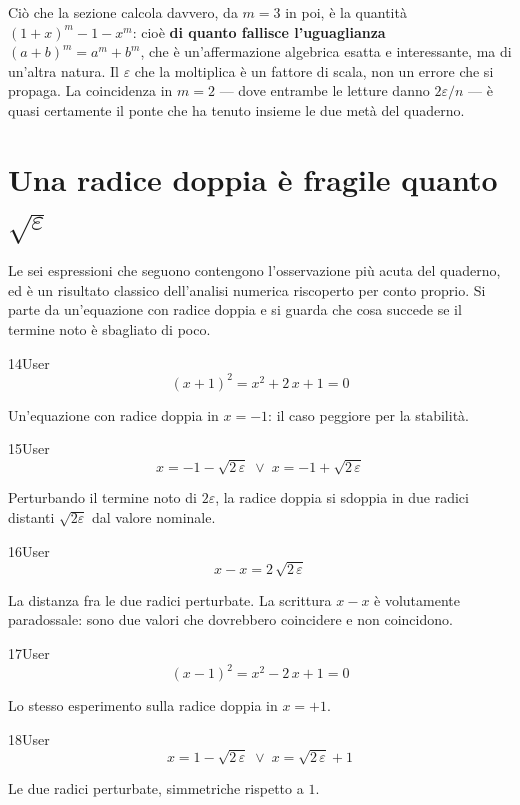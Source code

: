 Ciò che la sezione calcola davvero, da $m=3$ in poi, è la quantità $(1+x)^m-1-x^m$: cioè \textbf{di quanto fallisce l'uguaglianza $(a+b)^m=a^m+b^m$}, che è un'affermazione algebrica esatta e interessante, ma di un'altra natura. Il $\varepsilon$ che la moltiplica è un fattore di scala, non un errore che si propaga. La coincidenza in $m=2$ — dove entrambe le letture danno $2\varepsilon/n$ — è quasi certamente il ponte che ha tenuto insieme le due metà del quaderno.

\section{Una radice doppia è fragile quanto $\sqrt{\varepsilon}$}

Le sei espressioni che seguono contengono l'osservazione più acuta del quaderno, ed è un risultato classico dell'analisi numerica riscoperto per conto proprio. Si parte da un'equazione con radice doppia e si guarda che cosa succede se il termine noto è sbagliato di poco.

\begin{espr}{14}{User}{}
\[
\left(x + 1\right)^{2} = x^{2} + 2\, x + 1 = 0
\]
\end{espr}
Un'equazione con radice doppia in $x=-1$: il caso peggiore per la stabilità.

\begin{espr}{15}{User}{}
\[
x = -1 - \sqrt{2\, \varepsilon} \;\lor\; x = -1 + \sqrt{2\, \varepsilon}
\]
\end{espr}
Perturbando il termine noto di $2\varepsilon$, la radice doppia si sdoppia in due radici distanti $\sqrt{2\varepsilon}$ dal valore nominale.

\begin{espr}{16}{User}{}
\[
x - x = 2\, \sqrt{2\, \varepsilon}
\]
\end{espr}
La distanza fra le due radici perturbate. La scrittura $x-x$ è volutamente paradossale: sono due valori che dovrebbero coincidere e non coincidono.

\begin{espr}{17}{User}{}
\[
\left(x - 1\right)^{2} = x^{2} - 2\, x + 1 = 0
\]
\end{espr}
Lo stesso esperimento sulla radice doppia in $x=+1$.

\begin{espr}{18}{User}{}
\[
x = 1 - \sqrt{2\, \varepsilon} \;\lor\; x = \sqrt{2\, \varepsilon} + 1
\]
\end{espr}
Le due radici perturbate, simmetriche rispetto a $1$.

